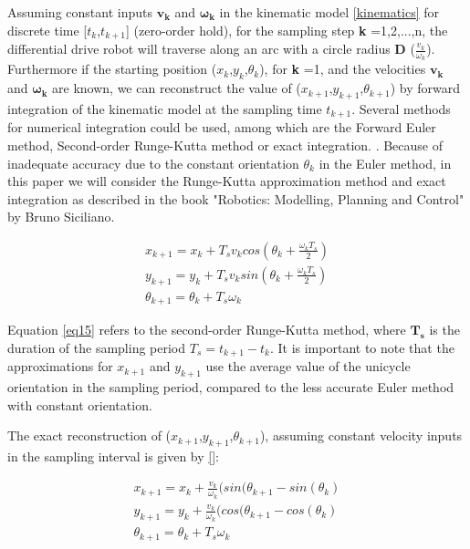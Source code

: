 Assuming constant inputs $\boldsymbol{v_k}$ and $\boldsymbol{\omega_k}$ in the kinematic model \ref{kinematics} for discrete time [$t_k$,$t_{k+1}$] (zero-order hold), for the sampling step \textbf{k} =1,2,...,n, the differential drive robot will traverse along an arc with a circle radius \textbf{D} ($\frac{v_k}{\omega_k}$). Furthermore if the starting position ($x_k$,$y_k$,$\theta_k$), for \textbf{k} =1, and the velocities $\boldsymbol{v_k}$ and $\boldsymbol{\omega_k}$ are known, we can reconstruct the value of ($x_{k+1}$,$y_{k+1}$,$\theta_{k+1}$) by forward integration of the kinematic model at the sampling time $t_{k+1}$. Several methods for numerical integration could be used, among which are the Forward Euler method, Second-order Runge-Kutta method or exact integration. . Because of inadequate accuracy due to the constant orientation $\theta_k$ in the Euler method, in this paper we will consider the Runge-Kutta approximation method and exact integration as described in the book "Robotics: Modelling, Planning and Control" by Bruno Siciliano.

\begin{align}
x_{k+1} = x_k + T_s v_k cos(\theta_k + \frac{\omega_k T_s}{2}) \\
y_{k+1} = y_k + T_s v_k sin(\theta_k + \frac{\omega_k T_s}{2}) \label{eq15} \\
\theta_{k+1} = \theta_k + T_s\omega_k  \nonumber 
\end{align}

Equation \ref{eq15} refers to the second-order Runge-Kutta method, where $\boldsymbol{T_s}$ is the duration of the sampling period $T_s = t_{k+1} - t_k$. It is important to note that the approximations for $x_{k+1}$ and $y_{k+1}$ use the average value of the unicycle orientation in the sampling period, compared to the less accurate Euler method with constant orientation.

The exact reconstruction of ($x_{k+1}$,$y_{k+1}$,$\theta_{k+1}$), assuming constant velocity inputs in the sampling interval is given by \ref{}: 

\begin{align}
x_{k+1} = x_k + \frac{v_k}{\omega_k}(sin(\theta_{k+1} - sin(\theta_k)\\
y_{k+1} = y_k + \frac{v_k}{\omega_k}(cos(\theta_{k+1} - cos(\theta_k) \label{eq16} \\
\theta_{k+1} = \theta_k + T_s\omega_k  \nonumber 
\end{align}

